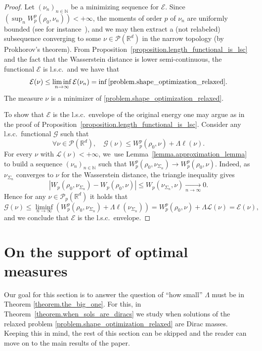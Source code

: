 \documentclass[JEP,XML,SOM,Unicode,NoFloatCountersInSection,published]{cedram}
\theoremstyle{definition}
\newcommand\E{\mathcal{E}}
\newcommand\G{\mathcal{G}}
\newcommand{\RR}{\mathbb{R}}
\begin{document}
\begin{proof}
Let $\left(\nu_n\right)_{n \in \mathbb{N}}$ be a minimizing sequence for $\mathcal{E}$. Since $\left(\sup_n W_p^p(\rho_0, \nu_n)\right)<+\infty$, the moments of order $p$ of $\nu_n$ are uniformly bounded (see for instance~\cite[Th.\,5.11]{santambrogio2015optimal}), and we may then extract a (not relabeled) subsequence converging to some $\nu \in \mathcal{P}(\RR^d)$ in the narrow topology (by Prokhorov's theorem). From Proposition~\ref{proposition.length_functional_is_lsc} and the fact that the Wasserstein distance is lower semi-continuous, the functional $\mathcal{E}$ is l.s.c.~and we have that
\[
\mathcal{E}(\nu) \le \liminf_{n \to \infty} \mathcal{E}(\nu_n) = \inf \eqref{problem.shape_optimization_relaxed}.
\]
The measure $\nu$ is a minimizer of \eqref{problem.shape_optimization_relaxed}.

To show that $\E$ is the l.s.c.~envelope of the original energy one may argue as in the proof of Proposition~\ref{proposition.length_functional_is_lsc}. Consider any l.s.c.~functional $\G$ such that
\begin{equation*}
\forall \nu \in \mathcal{P}(\RR^d),\quad \G(\nu)\leq W_p^p(\rho_0,\nu) +\Lambda \ell(\nu).
\end{equation*}
For every $\nu$ with $\mathcal{L}(\nu)<+\infty$, we~use Lemma~\ref{lemma.approximation_lemma} to build a sequence $(\nu_n)_{n \in \mathbb{N}}$ such that $W_p^p(\rho_0,\nu_{\Sigma_n}) \to W_p^p(\rho_0,\nu)$. Indeed, as $\nu_{\Sigma_n}$ converges to $\nu$ for the Wasserstein distance, the triangle inequality gives
\[
\left|
W_p(\rho_0, \nu_{\Sigma_n}) - W_p(\rho_0, \nu)
\right|
\le
W_p(\nu_{\Sigma_n}, \nu) \xrightarrow[n \to \infty]{} 0.
\]
Hence for any $\nu \in \mathcal{P}_p(\RR^d)$ it holds that
\begin{equation*}
\G(\nu)\leq \liminf_{n \to \infty} \left(W_p^p(\rho_0,\nu_{\Sigma_n})
+
\Lambda \ell(\nu_{\Sigma_n})\right)= W_p^p(\rho_0,\nu) +\Lambda \mathcal{L}(\nu)=\E(\nu),
\end{equation*}
and we conclude that $\mathcal{E}$ is the l.s.c.~envelope.
\end{proof}

\section{On the support of optimal measures}\label{section.geometric_properties_transport_map}
Our goal for this section is to answer the question of ``how small'' $\Lambda$ must be in Theorem \ref{theorem.the_big_one}. For this, in Theorem~\ref{theorem.when_sols_are_diracs} we study when solutions of the relaxed problem \eqref{problem.shape_optimization_relaxed} are Dirac masses. Keeping this in mind, the rest of this section can be skipped and the reader can move on to the main results of the paper.
\end{document}

